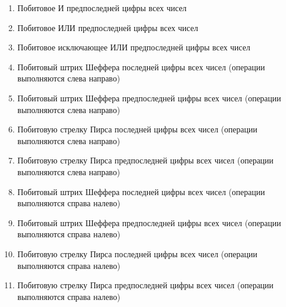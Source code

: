 \begin{enumerate} %
	\item Побитовое И предпоследней цифры всех чисел
	\item Побитовое ИЛИ предпоследней цифры  всех чисел
	\item Побитовое исключающее ИЛИ предпоследней цифры всех чисел
	\item Побитовый штрих Шеффера последней цифры всех чисел (операции выполняются слева направо)
	\item Побитовый штрих Шеффера предпоследней цифры всех чисел (операции выполняются слева направо)
	\item Побитовую стрелку Пирса последней цифры всех чисел (операции выполняются слева направо)
	\item Побитовую стрелку Пирса предпоследней цифры всех чисел (операции выполняются слева направо)
	\item Побитовый штрих Шеффера последней цифры всех чисел (операции выполняются справа налево)
	\item Побитовый штрих Шеффера предпоследней цифры всех чисел (операции выполняются справа налево)
	\item Побитовую стрелку Пирса последней цифры всех чисел (операции выполняются справа налево)
	\item Побитовую стрелку Пирса предпоследней цифры всех чисел (операции выполняются справа налево)


\end{enumerate}
